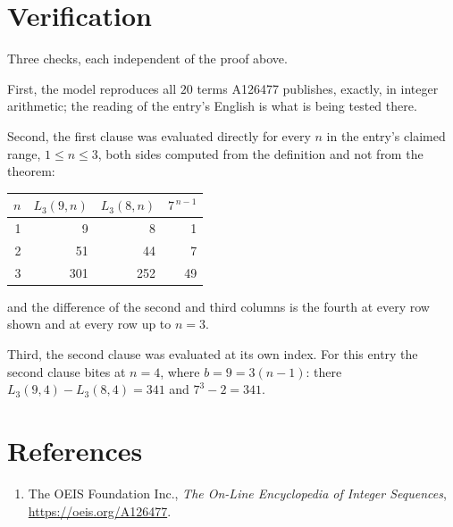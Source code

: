 \documentclass[11pt,a4paper]{article}
\theoremstyle{plain}
\theoremstyle{definition}
\begin{document}
\section{Verification}

Three checks, each independent of the proof above.

First, the model reproduces all $20$ terms A126477 publishes, exactly, in integer
arithmetic; the reading of the entry's English is what is being tested there.

Second, the first clause was evaluated directly for every $n$ in the entry's claimed range,
$1\le n\le3$, both sides computed from the definition and not from the theorem:

\begin{center}
\begin{tabular}{rrrr}
$n$ & $L_{3}(9,n)$ & $L_{3}(8,n)$ & $7^{\,n-1}$ \\ \hline
1 & 9 & 8 & 1 \\
2 & 51 & 44 & 7 \\
3 & 301 & 252 & 49 \\
\end{tabular}
\end{center}

\noindent and the difference of the second and third columns is the fourth at every row shown
and at every row up to $n=3$.

Third, the second clause was evaluated at its own index. For this entry the second clause bites at $n=4$, where $b=9=3(n-1)$: there $L_{3}(9,4)-L_{3}(8,4)=341$ and $7^{3}-2=341$.

\section*{References}
\begin{enumerate}
\item The OEIS Foundation Inc., \emph{The On-Line Encyclopedia of Integer Sequences},
\url{https://oeis.org/A126477}.
\end{enumerate}
\end{document}
